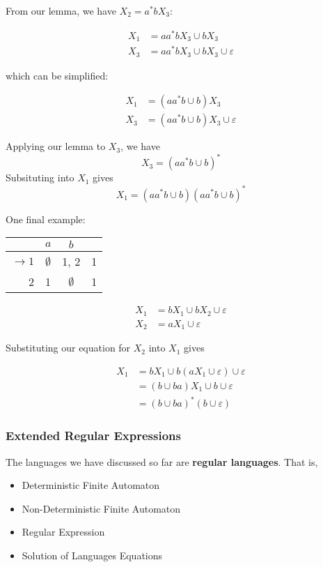 From our lemma, we have $X_2=a^*bX_3$:

\begin{align*}
      X_1 &= aa^*bX_3\cup bX_3\\
      X_3 &= aa^*bX_3\cup bX_3\cup\varepsilon
\end{align*}

which can be simplified:

\begin{align*}
      X_1 &= (aa^*b\cup b)X_3\\
      X_3 &= (aa^*b\cup b)X_3\cup\varepsilon
\end{align*}

Applying our lemma to $X_3$, we have \[X_3=(aa^*b\cup b)^*\] Subsituting into $X_1$ gives \[X_1=(aa^*b\cup b)(aa^*b\cup b)^*\] 

One final example:

\begin{center}\begin{tabular}{r| c c r}
      & $a$ & $b$ & \\\hline
      $\to 1$ & $\emptyset$ & 1, 2 & 1\\
            2 & 1 & $\emptyset$ & 1\\
 \end{tabular}\end{center}

\begin{align*}
      X_1 &= bX_1\cup bX_2\cup\varepsilon\\
      X_2 &= aX_1\cup\varepsilon
\end{align*}

Substituting our equation for $X_2$ into $X_1$ gives 

\begin{align*}
      X_1&=bX_1\cup b(aX_1\cup\varepsilon)\cup\varepsilon\\
         &=(b\cup ba)X_1\cup b\cup\varepsilon\\
         &=(b\cup ba)^*(b\cup\varepsilon)
\end{align*}

\subsubsection{Extended Regular Expressions}
The languages we have discussed so far are \textbf{regular languages}. That is, 

\begin{itemize}
      \item Deterministic Finite Automaton
      \item Non-Deterministic Finite Automaton
      \item Regular Expression
      \item Solution of Languages Equations
\end{itemize}

